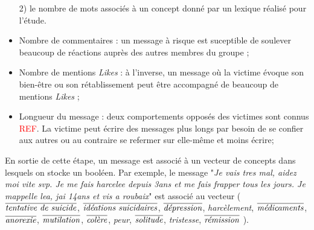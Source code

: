 \begin{itemize}
2) le nombre de mots associés à un concept donné par un lexique réalisé pour l'étude.
\item Nombre de commentaires : un message à risque est suceptible de soulever beaucoup de réactions auprès des autres membres du groupe ;
\item Nombre de mentions \emph{Likes} : à l'inverse, un message où la victime évoque son bien-être ou son rétablissement peut être accompagné de beaucoup de mentions \emph{Likes} ;
\item Longueur du message : deux comportements opposés des victimes sont connus \textcolor{red}{REF}. La victime peut écrire des messages plus longs par besoin de se confier aux autres ou au contraire se refermer sur elle-même et moins écrire;

\end{itemize}



En sortie de cette étape, un message est associé à un vecteur de concepts dans lesquels on stocke un booléen.
Par exemple, le message "\textit{Je vais tres mal, aidez moi vite svp. Je me fais harcelee depuis 3ans et me fais frapper tous les jours. Je mappelle lea, jai 14ans et vis a roubaix}" est associé au vecteur 
(
$\overline{\mbox{\emph{tentative de suicide}}}$, 
$\overline{\mbox{\emph{idéations suicidaires}}}$,
$\overline{\mbox{\emph{dépression}}}$,
\emph{harcèlement},
$\overline{\mbox{\emph{médicaments}}}$,
$\overline{\mbox{\emph{anorexie}}}$,
$\overline{\mbox{\emph{mutilation}}}$,
$\overline{\mbox{\emph{colère}}}$,
\emph{peur},
$\overline{\mbox{\emph{solitude}}}$,
\emph{tristesse},
$\overline{\mbox{\emph{rémission}}}$
).





